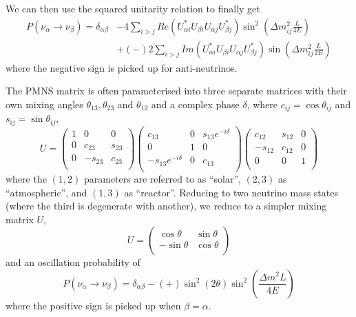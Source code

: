 We can then use the squared unitarity relation to finally get
\begin{align}
P(\nu_\alpha \rightarrow \nu_\beta) = \delta_{\alpha \beta} &- 4\sum_{i>j} Re\left(U^*_{\alpha i} U_{\beta i} U_{\alpha j} U^*_{\beta j}\right)  \sin^2 ( \Delta m^2_{ij}\frac{L}{4E} ) \\
									&+(-) 2\sum_{i>j} Im\left( U^*_{\alpha i} U_{\beta i} U_{\alpha j} U^*_{\beta j} \right) \sin ( \Delta m^2_{ij}\frac{L}{2E} )
\end{align}
where the negative sign is picked up for anti-neutrinos.

The PMNS matrix is often parameterised into three separate matrices with their own mixing angles $\theta_{13},\theta_{23}$ and $\theta_{12}$ and a complex phase $\delta$, where $c_{ij}=\cos\theta_{ij}$ and $s_{ij}=\sin\theta_{ij}$\cite{boris_mixing},
\begin{equation}
U = 
\begin{pmatrix}
1 & 0 & 0 \\
0 & c_{23} & s_{23} \\
0 & -s_{23} & c_{23} \\
\end{pmatrix}
\begin{pmatrix}
c_{13} & 0 & s_{13}e^{-i\delta} \\
0 & 1 & 0 \\
-s_{13}e^{-i\delta} & 0 & c_{13} \\
\end{pmatrix}
\begin{pmatrix}
c_{12} & s_{12} & 0 \\
-s_{12} & c_{12} & 0 \\
0 & 0 & 1 \\
\end{pmatrix}
\end{equation}
where the $(1,2)$ parameters are referred to as ``solar'', $(2,3)$ as ``atmospheric'', and $(1,3)$ as ``reactor''. Reducing to two neutrino mass states (where the third is degenerate with another), we reduce to a simpler mixing matrix $U$,
\begin{equation}
U = 
\begin{pmatrix}
\cos\theta & \sin\theta \\
- \sin\theta & \cos \theta \\
\end{pmatrix}
\end{equation}
and an oscillation probability of 
\begin{equation}
P(\nu_\alpha \rightarrow \nu_\beta) = \delta_{\alpha \beta} -(+) \sin^2 \left( 2\theta \right) \sin^2 \left( \frac{\Delta m^2 L}{4E} \right)
\end{equation}
where the positive sign is picked up when $\beta = \alpha$.

